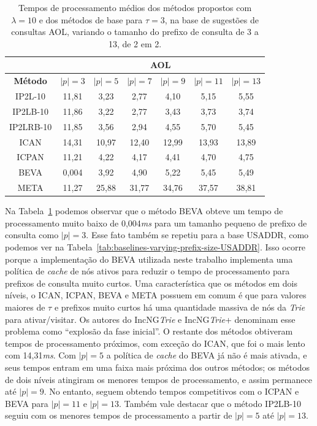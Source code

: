\begin{table}[h]
\centering
\begin{tabular}{c|c|c|c|c|c|c|}
\cline{2-7}
\multicolumn{1}{l|}{} & \multicolumn{6}{c|}{\textbf{AOL}} \\ \hline
\multicolumn{1}{|c|}{\textbf{Método}} & $|p| =  3$ & $|p| =  5$ & $|p| =  7$ & $|p| =  9$ & $|p| =  11$ & $|p| =  13$ \\ \hline
\multicolumn{1}{|c|}{IP2L-10} & 11,81 & 3,23 & 2,77 & 4,10 & 5,15 & 5,55 \\ \hline
\multicolumn{1}{|c|}{IP2LB-10} & 11,86 & 3,22 & 2,77 & 3,43 & 3,73 & 3,74 \\ \hline
\multicolumn{1}{|c|}{IP2LRB-10} & 11,85 & 3,56 & 2,94 & 4,55 & 5,70 & 5,45 \\ \hline
\multicolumn{1}{|c|}{ICAN} & 14,31 & 10,97 & 12,40 & 12,99 & 13,93 & 13,89 \\ \hline
\multicolumn{1}{|c|}{ICPAN} & 11,21 & 4,22 & 4,17 & 4,41 & 4,70 & 4,75 \\ \hline
\multicolumn{1}{|c|}{BEVA} & 0,004 & 3,92 & 4,90 & 5,22 & 5,45 & 5,49 \\ \hline
\multicolumn{1}{|c|}{META} & 11,27 & 25,88 & 31,77 & 34,76 & 37,57 & 38,81 \\ \hline
\end{tabular}
\caption{Tempos de processamento médios dos métodos propostos com $\lambda=10$ e dos métodos de base para $\tau=3$, na base de sugestões de consultas AOL, variando o tamanho do prefixo de consulta de 3 a 13, de 2 em 2.}
\label{tab:baselines-varying-prefix-size-AOL}
\end{table}

Na Tabela~\ref{tab:baselines-varying-prefix-size-AOL} podemos observar que o método BEVA obteve um tempo de processamento muito baixo de 0,004\textit{ms} para um tamanho pequeno de prefixo de consulta como $|p|=3$. Esse fato também se repetiu para a base USADDR, como podemos ver na Tabela~\ref{tab:baselines-varying-prefix-size-USADDR}. Isso ocorre porque a implementação do BEVA utilizada neste trabalho implementa uma política de \textit{cache} de nós ativos para reduzir o tempo de processamento para prefixos de consulta muito curtos. Uma característica que os métodos em dois níveis, o ICAN, ICPAN, BEVA e META possuem em comum é que para valores maiores de $\tau$ e prefixos muito curtos há uma quantidade massiva de nós da \textit{Trie} para ativar/visitar. Os autores do IncNG\textit{Trie} \citep{xiao2013efficient} e IncNG\textit{Trie}+ \citep{qin2020efficient} denominam esse problema como ``explosão da fase inicial''. O restante dos métodos obtiveram tempos de processamento próximos, com exceção do ICAN, que foi o mais lento com 14,31\textit{ms}. Com $|p|=5$ a política de \textit{cache} do BEVA já não é mais ativada, e seus tempos entram em uma faixa mais próxima dos outros métodos; os métodos de dois níveis atingiram os menores tempos de processamento, e assim permanece até $|p|=9$. No entanto, seguem obtendo tempos competitivos com o ICPAN e BEVA para $|p|=11$ e $|p|=13$. Também vale destacar que o método IP2LB-10 seguiu com os menores tempos de processamento a partir de $|p|=5$ até $|p|=13$.

